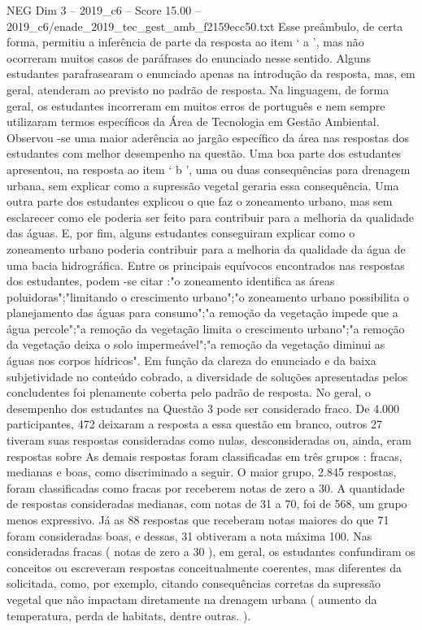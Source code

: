 \begin{textsample}{NEG Dim 3 – 2019\_c6 – Score 15.00 – 2019\_c6/enade\_2019\_tec\_gest\_amb\_f2159ecc50.txt}
Esse preâmbulo, de certa forma, permitiu a inferência de parte da resposta ao item ‘ a ’, mas não ocorreram muitos casos de paráfrases do enunciado nesse sentido.
Alguns estudantes parafrasearam o enunciado apenas na introdução da resposta, mas, em geral, atenderam ao previsto no padrão de resposta.
Na linguagem, de forma geral, os estudantes incorreram em muitos erros de português e nem sempre utilizaram termos específicos da Área de Tecnologia em Gestão Ambiental.
Observou -se uma maior aderência ao jargão específico da área nas respostas dos estudantes com melhor desempenho na questão.
Uma boa parte dos estudantes apresentou, na resposta ao item ‘ b ’, uma ou duas consequências para drenagem urbana, sem explicar como a supressão vegetal geraria essa consequência.
Uma outra parte dos estudantes explicou o que faz o zoneamento urbano, mas sem esclarecer como ele poderia ser feito para contribuir para a melhoria da qualidade das águas.
E, por fim, alguns estudantes conseguiram explicar como o zoneamento urbano poderia contribuir para a melhoria da qualidade da água de uma bacia hidrográfica.
Entre os principais equívocos encontrados nas respostas dos estudantes, podem -se citar :"o zoneamento identifica as áreas poluidoras";"limitando o crescimento urbano";"o zoneamento urbano possibilita o planejamento das águas para consumo";"a remoção da vegetação impede que a água percole";"a remoção da vegetação limita o crescimento urbano";"a remoção da vegetação deixa o solo impermeável";"a remoção da vegetação diminui as águas nos corpos hídricos".
Em função da clareza do enunciado e da baixa subjetividade no conteúdo cobrado, a diversidade de soluções apresentadas pelos concludentes foi plenamente coberta pelo padrão de resposta.
No geral, o desempenho dos estudantes na Questão 3 pode ser considerado fraco.
De 4.000 participantes, 472 deixaram a resposta a essa questão em branco, outros 27 tiveram suas respostas consideradas como nulas, desconsideradas ou, ainda, eram respostas sobre As demais respostas foram classificadas em três grupos : fracas, medianas e boas, como discriminado a seguir.
O maior grupo, 2.845 respostas, foram classificadas como fracas por receberem notas de zero a 30.
A quantidade de respostas consideradas medianas, com notas de 31 a 70, foi de 568, um grupo menos expressivo.
Já as 88 respostas que receberam notas maiores do que 71 foram consideradas boas, e dessas, 31 obtiveram a nota máxima 100.
Nas consideradas fracas ( notas de zero a 30 ), em geral, os estudantes confundiram os conceitos ou escreveram respostas conceitualmente coerentes, mas diferentes da solicitada, como, por exemplo, citando consequências corretas da supressão vegetal que não impactam diretamente na drenagem urbana ( aumento da temperatura, perda de habitats, dentre outras. ).

\end{textsample}
